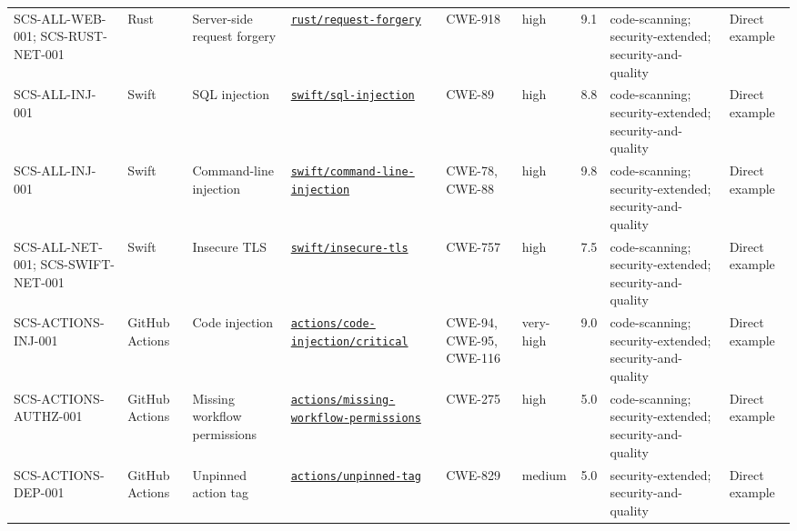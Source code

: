 \documentclass[10pt,letterpaper]{article}
\newcommand{\code}[1]{\begingroup\small\ttfamily\def\UrlFont{\ttfamily}\nolinkurl{#1}\endgroup}
\begin{document}
\begin{landscape}
\begin{longtable}{@{}P{0.95in}P{0.85in}P{1.2in}P{1.55in}P{0.75in}P{0.45in}P{0.45in}P{1.5in}P{0.7in}@{}}
SCS-ALL-WEB-001; SCS-RUST-NET-001 & Rust & Server-side request forgery & \href{https://codeql.github.com/codeql-query-help/rust/rust-request-forgery/}{\code{rust/request-forgery}} & CWE-918 & high & 9.1 & code-scanning; security-extended; security-and-quality & Direct example\\
SCS-ALL-INJ-001 & Swift & SQL injection & \href{https://codeql.github.com/codeql-query-help/swift/swift-sql-injection/}{\code{swift/sql-injection}} & CWE-89 & high & 8.8 & code-scanning; security-extended; security-and-quality & Direct example\\
SCS-ALL-INJ-001 & Swift & Command-line injection & \href{https://codeql.github.com/codeql-query-help/swift/swift-command-line-injection/}{\code{swift/command-line-injection}} & CWE-78, CWE-88 & high & 9.8 & code-scanning; security-extended; security-and-quality & Direct example\\
SCS-ALL-NET-001; SCS-SWIFT-NET-001 & Swift & Insecure TLS & \href{https://codeql.github.com/codeql-query-help/swift/swift-insecure-tls/}{\code{swift/insecure-tls}} & CWE-757 & high & 7.5 & code-scanning; security-extended; security-and-quality & Direct example\\
SCS-ACTIONS-INJ-001 & GitHub Actions & Code injection & \href{https://codeql.github.com/codeql-query-help/actions/actions-code-injection-critical/}{\code{actions/code-injection/critical}} & CWE-94, CWE-95, CWE-116 & very-high & 9.0 & code-scanning; security-extended; security-and-quality & Direct example\\
SCS-ACTIONS-AUTHZ-001 & GitHub Actions & Missing workflow permissions & \href{https://codeql.github.com/codeql-query-help/actions/actions-missing-workflow-permissions/}{\code{actions/missing-workflow-permissions}} & CWE-275 & high & 5.0 & code-scanning; security-extended; security-and-quality & Direct example\\
SCS-ACTIONS-DEP-001 & GitHub Actions & Unpinned action tag & \href{https://codeql.github.com/codeql-query-help/actions/actions-unpinned-tag/}{\code{actions/unpinned-tag}} & CWE-829 & medium & 5.0 & security-extended; security-and-quality & Direct example\\
\bottomrule
\end{longtable}
\normalsize
\end{landscape}
\end{document}
